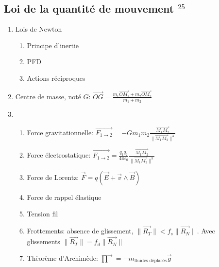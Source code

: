 \documentclass[fleqn]{article}
\theoremstyle{definition} \newtheorem*{defi}{D\'efinition}
\theoremstyle{definition} \newtheorem*{theo}{Th\'eor\`eme}
\theoremstyle{definition} \newtheorem*{coro}{Corollaire}
\theoremstyle{remark} \newtheorem*{rqs}{Remarques}
\theoremstyle{definition} \newtheorem*{prop}{Propri\'et\'e}
\begin{document}
\subsection{Loi de la quantit\'e de mouvement $^{25}$}
\begin{enumerate}
	\item Lois de Newton
		\begin{enumerate}
			\item Principe d'inertie
			\item PFD
			\item Actions r\'eciproques
		\end{enumerate}
	\item Centre de masse, not\'e $G$: $\vec{OG} = \frac{m_1 \vec{OM_1} + m_2 \vec{OM_2}}{m_1 + m_2}$
	\item
		\begin{enumerate}
			\item Force gravitationnelle: $\vec{F_{1 \rightarrow 2}} = -Gm_1 m_2 \frac{\vec{M_1 M_2}}{\|\vec{M_1 M_2}\|^3}$
			\item Force \'electrostatique: $\vec{F_{1 \rightarrow 2}} = \frac{q_1 q_2}{4\pi\epsilon_0} \frac{\vec{M_1 M_2}}{\|\vec{M_1 M_2}\|^3}$
			\item Force de Lorentz: $\vec{F} = q(\vec{E} + \vec{v}\land \vec{B})$
			\item Force de rappel \'elastique
			\item Tension fil
			\item Frottements: absence de glissement, $\|\vec{R_T}\| < f_s \|\vec{R_N}\|$. Avec glissements $\|\vec{R_T}\| = f_d \|\vec{R_N}\|$
			\item Th\`eor\`eme d'Archim\`ede: $\vec{\prod} = -m_{\text{fluides d\'eplac\'es}} \vec{g}$
		\end{enumerate}
\end{enumerate}
\end{document}
